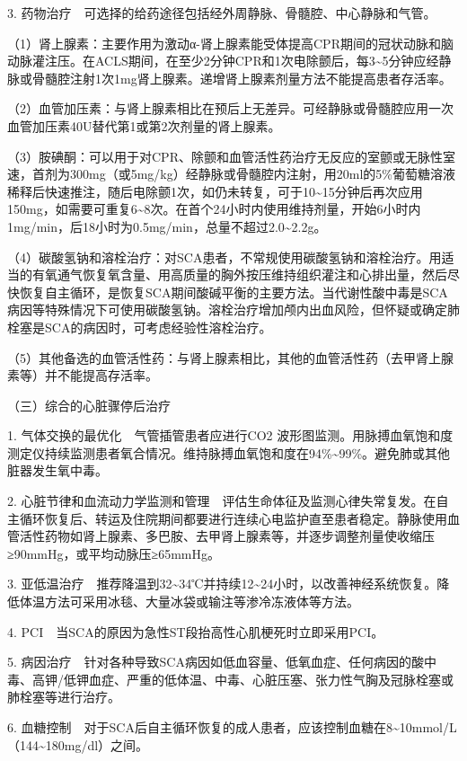 3. 药物治疗　可选择的给药途径包括经外周静脉、骨髓腔、中心静脉和气管。

（1）肾上腺素：主要作用为激动α-肾上腺素能受体提高CPR期间的冠状动脉和脑动脉灌注压。在ACLS期间，在至少2分钟CPR和1次电除颤后，每3\textasciitilde{}5分钟应经静脉或骨髓腔注射1次1mg肾上腺素。递增肾上腺素剂量方法不能提高患者存活率。

（2）血管加压素：与肾上腺素相比在预后上无差异。可经静脉或骨髓腔应用一次血管加压素40U替代第1或第2次剂量的肾上腺素。

（3）胺碘酮：可以用于对CPR、除颤和血管活性药治疗无反应的室颤或无脉性室速，首剂为300mg（或5mg/kg）经静脉或骨髓腔内注射，用20ml的5\%葡萄糖溶液稀释后快速推注，随后电除颤1次，如仍未转复，可于10\textasciitilde{}15分钟后再次应用150mg，如需要可重复6\textasciitilde{}8次。在首个24小时内使用维持剂量，开始6小时内1mg/min，后18小时为0.5mg/min，总量不超过2.0\textasciitilde{}2.2g。

（4）碳酸氢钠和溶栓治疗：对SCA患者，不常规使用碳酸氢钠和溶栓治疗。用适当的有氧通气恢复氧含量、用高质量的胸外按压维持组织灌注和心排出量，然后尽快恢复自主循环，是恢复SCA期间酸碱平衡的主要方法。当代谢性酸中毒是SCA病因等特殊情况下可使用碳酸氢钠。溶栓治疗增加颅内出血风险，但怀疑或确定肺栓塞是SCA的病因时，可考虑经验性溶栓治疗。

（5）其他备选的血管活性药：与肾上腺素相比，其他的血管活性药（去甲肾上腺素等）并不能提高存活率。

{（三）综合的心脏骤停后治疗}

1. 气体交换的最优化　气管插管患者应进行CO{2}
波形图监测。用脉搏血氧饱和度测定仪持续监测患者氧合情况。维持脉搏血氧饱和度在94\%\textasciitilde{}99\%。避免肺或其他脏器发生氧中毒。

2.
心脏节律和血流动力学监测和管理　评估生命体征及监测心律失常复发。在自主循环恢复后、转运及住院期间都要进行连续心电监护直至患者稳定。静脉使用血管活性药物如肾上腺素、多巴胺、去甲肾上腺素等，并逐步调整剂量使收缩压≥90mmHg，或平均动脉压≥65mmHg。

3.
亚低温治疗　推荐降温到32\textasciitilde{}34℃并持续12\textasciitilde{}24小时，以改善神经系统恢复。降低体温方法可采用冰毯、大量冰袋或输注等渗冷冻液体等方法。

4. PCI　当SCA的原因为急性ST段抬高性心肌梗死时立即采用PCI。

5.
病因治疗　针对各种导致SCA病因如低血容量、低氧血症、任何病因的酸中毒、高钾/低钾血症、严重的低体温、中毒、心脏压塞、张力性气胸及冠脉栓塞或肺栓塞等进行治疗。

6.
血糖控制　对于SCA后自主循环恢复的成人患者，应该控制血糖在8\textasciitilde{}10mmol/L（144\textasciitilde{}180mg/dl）之间。

